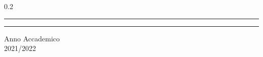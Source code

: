 \begin{titlepage}
\begin{center}
\begin{spacing}{0.2}
\rule{\linewidth}{0.4pt}
\rule{\linewidth}{0.4pt}
\end{spacing}

\vfill

{\large {Anno Accademico}\\ 2021/2022}

\end{center}
\end{titlepage}